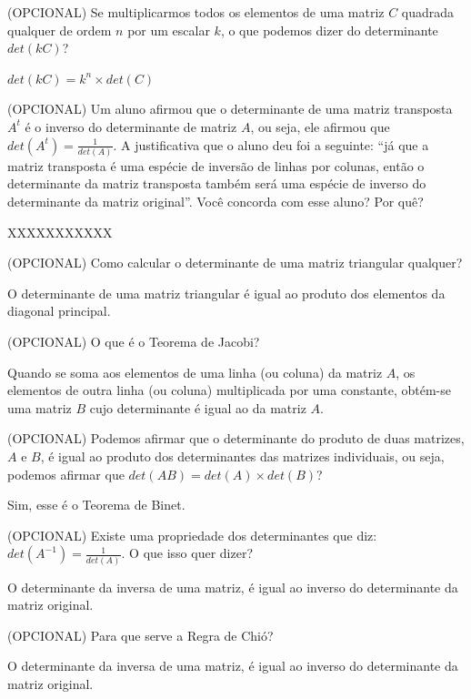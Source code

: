 \documentclass[pdftex, brazil, 12pt, oneside, addpoints]{exam}
\begin{document}
\begin{questions}
\question
(OPCIONAL) Se multiplicarmos todos os elementos de uma matriz $C$ quadrada qualquer
de ordem $n$ por um escalar $k$, o que podemos dizer do determinante
$det(kC)$?
\begin{solution}
  $det(kC) = k^n \times det(C)$
\end{solution}

\question
(OPCIONAL) Um aluno afirmou que o determinante de uma matriz transposta $A^t$ é o
inverso do determinante de matriz $A$, ou seja, ele afirmou que
$\displaystyle det(A^t) = \frac{1}{det(A)}$. A justificativa que o aluno deu foi a
seguinte: ``já que a matriz transposta é uma espécie de inversão de
linhas por colunas, então o determinante da matriz transposta também
será uma espécie de inverso do determinante da matriz original''. Você
concorda com esse aluno? Por quê?
\begin{solution}
  XXXXXXXXXXX
\end{solution}

\question
(OPCIONAL) Como calcular o determinante de uma matriz triangular qualquer?
\begin{solution}
  O determinante de uma matriz triangular é igual ao produto dos
  elementos da diagonal principal.
\end{solution}

\question
(OPCIONAL) O que é o Teorema de Jacobi?
\begin{solution}
  Quando se soma aos elementos de uma linha (ou coluna) da matriz $A$,
  os elementos de outra linha (ou coluna) multiplicada por uma
  constante, obtém-se uma matriz $B$ cujo determinante é igual ao da
  matriz $A$.
\end{solution}

\question
(OPCIONAL) Podemos afirmar que o determinante do produto de duas matrizes, $A$ e
$B$, é igual ao produto dos determinantes das matrizes individuais, ou
seja, podemos afirmar que $det(AB) = det(A) \times det(B)$?
\begin{solution}
  Sim, esse é o Teorema de Binet.
\end{solution}

\question
(OPCIONAL) Existe uma propriedade dos determinantes que diz: $\displaystyle det(A^{-1}) =
\frac{1}{det(A)}$. O que isso quer dizer?
\begin{solution}
  O determinante da inversa de uma matriz, é igual ao inverso do
  determinante da matriz original.
\end{solution}

\question
(OPCIONAL) Para que serve a Regra de Chió?
\begin{solution}
  O determinante da inversa de uma matriz, é igual ao inverso do
  determinante da matriz original.
\end{solution}



\end{questions}
\end{document}
